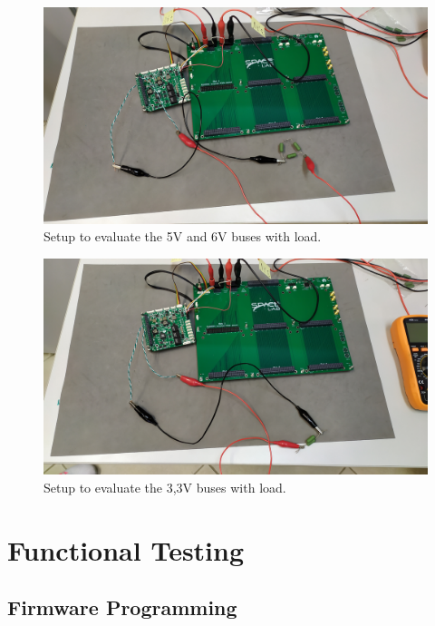 \begin{figure}[!ht]
    \begin{center}
        \includegraphics[width=\columnwidth]{figures/v02/5v_6v_setup_test.jpg}
        \caption{Setup to evaluate the 5V and 6V buses with load.}
        \label{fig:5v_6v_setup_test}
    \end{center}
\end{figure}

\begin{figure}[!ht]
    \begin{center}
        \includegraphics[width=\columnwidth]{figures/v02/3v3_setup_test.jpg}
        \caption{Setup to evaluate the 3,3V buses with load.}
        \label{fig:3v3_setup_test}
    \end{center}
\end{figure}

\section{Functional Testing}

\subsection{Firmware Programming}

